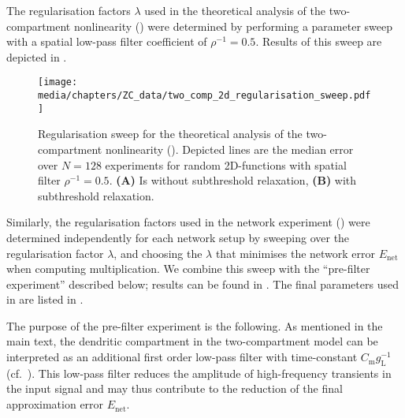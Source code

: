 The regularisation factors $\lambda$ used in the theoretical analysis of the two-compartment \LIF nonlinearity () were determined by performing a parameter sweep with a spatial low-pass filter coefficient of $\rho^{-1} = 0.5$.
Results of this sweep are depicted in .
\begin{figure}
	\centering
	\texttt{[image: media/chapters/ZC\_data/two\_comp\_2d\_regularisation\_sweep.pdf]}
	\caption[Regularisation sweep for the theoretical analysis of the two-compartment LIF nonlinearity]{Regularisation sweep for the theoretical analysis of the two-compartment \LIF nonlinearity (). Depicted lines are the median error over $N=128$ experiments for random 2D-functions with spatial filter $\rho^{-1} = 0.5$.
	\textbf{(A)} Is without subthreshold relaxation, \textbf{(B)} with subthreshold relaxation.}
	\label{fig:two_comp_2d_regularisation_sweep}
\end{figure}

Similarly, the regularisation factors used in the network experiment () were determined independently for each network setup by sweeping over the regularisation factor $\lambda$, and choosing the $\lambda$ that minimises the network error $E_\mathrm{net}$ when computing multiplication.
We combine this sweep with the \enquote{pre-filter experiment} described below; results can be found in .
The final parameters used in  are listed in .

The purpose of the pre-filter experiment is the following.
As mentioned in the main text, the dendritic compartment in the two-compartment model can be interpreted as an additional first order low-pass filter with time-constant $C_\mathrm{m} g_\mathrm{L}^{-1}$ (cf.~).
This low-pass filter reduces the amplitude of high-frequency transients in the input signal and may thus contribute to the reduction of the final approximation error $E_\mathrm{net}$.

